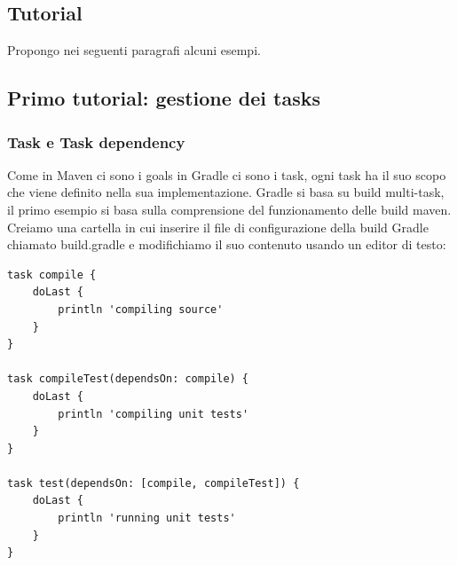 \documentclass{article}
\begin{document}
\begin{flushleft}
\section{Tutorial} %
Propongo nei seguenti paragrafi alcuni esempi.

\subsection{Primo tutorial: gestione dei tasks}

\subsubsection{Task e Task dependency}
Come in Maven ci sono i goals in Gradle ci sono i task, ogni task ha il suo scopo che viene definito nella sua implementazione. Gradle si basa su build multi-task, il primo esempio si basa sulla comprensione del funzionamento delle build maven. Creiamo una cartella in cui inserire il file di configurazione della build Gradle chiamato build.gradle e modifichiamo il suo contenuto usando un editor di testo:
\begin{verbatim}
task compile {
    doLast {
        println 'compiling source'
    }
}

task compileTest(dependsOn: compile) {
    doLast {
        println 'compiling unit tests'
    }
}

task test(dependsOn: [compile, compileTest]) {
    doLast {
        println 'running unit tests'
    }
}


\end{verbatim}
\end{flushleft}
\end{document}
